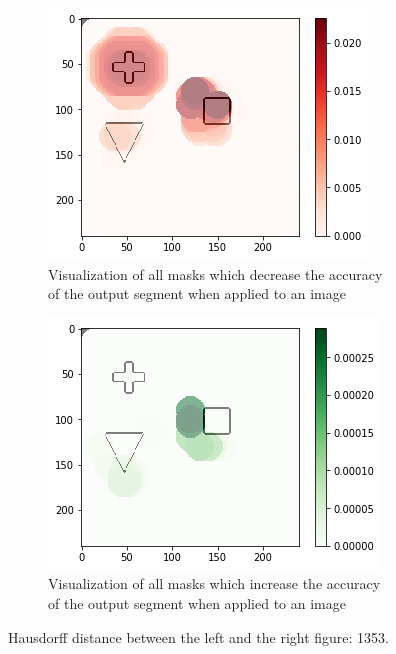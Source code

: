 \begin{figure}[H]
    \centering
    \begin{subfigure}{.5\textwidth}
        \centering
        \includegraphics[width=0.9\linewidth]{chapters/06_hdm/visualization/hdm_worse.png}
        \caption{Visualization of all masks which decrease the accuracy of the output segment when applied to an image}
    \end{subfigure}\hfill%
    \begin{subfigure}{.5\textwidth}
        \centering
        \includegraphics[width=0.9\linewidth]{chapters/06_hdm/visualization/hdm_better.png}
        \caption{Visualization of all masks which increase the accuracy of the output segment when applied to an image}
    \end{subfigure}
    \caption{Hausdorff distance between the left and the right figure: 1353. }
    \label{hdm_visualization_better_worsebetter}
\end{figure}
